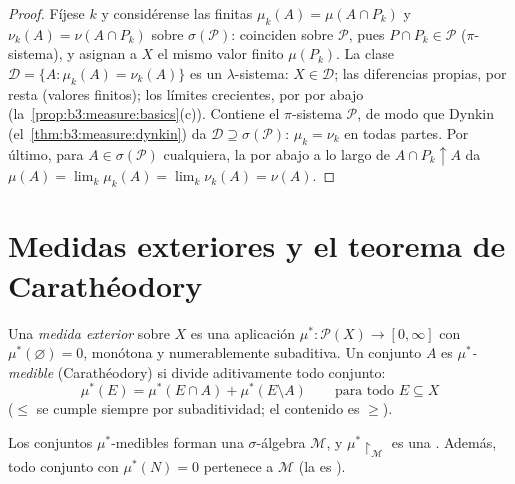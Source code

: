 \begin{proof}
Fíjese $k$ y considérense las 
finitas $\mu_k(A) = \mu(A \cap
P_k)$ y $\nu_k(A) = \nu(A \cap P_k)$ sobre $\sigma(\mathcal
P)$: coinciden sobre $\mathcal P$, pues $P \cap P_k \in \mathcal
P$ ($\pi$-sistema), y asignan a $X$ el mismo valor finito $\mu(P_k)$. La
clase $\mathcal D = \{A : \mu_k(A) =
\nu_k(A)\}$ es un $\lambda$-sistema: $X \in \mathcal D$; las diferencias
propias, por resta (valores finitos); los límites crecientes, por
 por abajo
(la~\cref{prop:b3:measure:basics}(c)). Contiene el $\pi$-sistema
$\mathcal P$, de modo que Dynkin (el~\cref{thm:b3:measure:dynkin}) da
$\mathcal D \supseteq
\sigma(\mathcal P)$: $\mu_k = \nu_k$ en todas partes. Por último, para
$A \in \sigma(\mathcal P)$ cualquiera, la
 por abajo a lo largo de
$A
\cap P_k \uparrow A$ da $\mu(A) = \lim_k\mu_k(A) =
\lim_k\nu_k(A) = \nu(A)$.
\end{proof}

\section{Medidas exteriores y el teorema de Carathéodory}

\begin{definition}\label{def:b3:measure:outer}
Una \emph{medida exterior} sobre $X$ es una
aplicación $\mu^* \colon \mathcal P(X) \to [0, \infty]$ con
$\mu^*(\varnothing) = 0$, monótona y numerablemente subaditiva. Un
conjunto $A$ es \emph{$\mu^*$-medible} (Carathéodory) si divide
aditivamente todo conjunto:
\[
\mu^*(E) = \mu^*(E \cap A) + \mu^*(E \setminus A)
\qquad \text{para todo } E \subseteq X
\]
($\leq$ se cumple siempre por subaditividad; el contenido es $\geq$).
\end{definition}

\begin{theorem}[Carathéodory]\label{thm:b3:measure:caratheodory}
Los conjuntos $\mu^*$-medibles forman una $\sigma$-álgebra $\mathcal
M$, y $\mu^*\restriction_{\mathcal M}$ es una
. Además, todo conjunto con
$\mu^*(N) = 0$ pertenece a $\mathcal M$ (la
 es
\emph{}).
\end{theorem}

